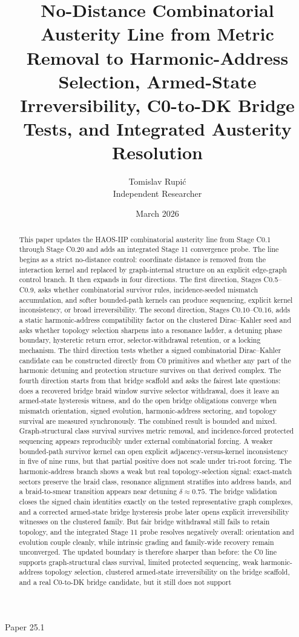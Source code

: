 \documentclass[11pt]{article}
\title{No-Distance Combinatorial Austerity Line from Metric Removal to Harmonic-Address Selection, Armed-State Irreversibility, C0-to-DK Bridge Tests, and Integrated Austerity Resolution}
\author{Tomislav Rupi\'c \\ Independent Researcher}
\date{March 2026}
\begin{document}
\maketitle
\begin{center}
\large Paper 25.1
\end{center}

\begin{abstract}
This paper updates the HAOS-IIP combinatorial austerity line from Stage C0.1 through Stage C0.20 and adds an integrated Stage 11 convergence probe. The line begins as a strict no-distance control: coordinate distance is removed from the interaction kernel and replaced by graph-internal structure on an explicit edge-graph control branch. It then expands in four directions. The first direction, Stages C0.5--C0.9, asks whether combinatorial survivor rules, incidence-seeded mismatch accumulation, and softer bounded-path kernels can produce sequencing, explicit kernel inconsistency, or broad irreversibility. The second direction, Stages C0.10--C0.16, adds a static harmonic-address compatibility factor on the clustered Dirac--Kahler seed and asks whether topology selection sharpens into a resonance ladder, a detuning phase boundary, hysteretic return error, selector-withdrawal retention, or a locking mechanism. The third direction tests whether a signed combinatorial Dirac--Kahler candidate can be constructed directly from C0 primitives and whether any part of the harmonic detuning and protection structure survives on that derived complex. The fourth direction starts from that bridge scaffold and asks the fairest late questions: does a recovered bridge braid window survive selector withdrawal, does it leave an armed-state hysteresis witness, and do the open bridge obligations converge when mismatch orientation, signed evolution, harmonic-address sectoring, and topology survival are measured synchronously. The combined result is bounded and mixed. Graph-structural class survival survives metric removal, and incidence-forced protected sequencing appears reproducibly under external combinatorial forcing. A weaker bounded-path survivor kernel can open explicit adjacency-versus-kernel inconsistency in five of nine runs, but that partial positive does not scale under tri-root forcing. The harmonic-address branch shows a weak but real topology-selection signal: exact-match sectors preserve the braid class, resonance alignment stratifies into address bands, and a braid-to-smear transition appears near detuning $\delta \approx 0.75$. The bridge validation closes the signed chain identities exactly on the tested representative graph complexes, and a corrected armed-state bridge hysteresis probe later opens explicit irreversibility witnesses on the clustered family. But fair bridge withdrawal still fails to retain topology, and the integrated Stage 11 probe resolves negatively overall: orientation and evolution couple cleanly, while intrinsic grading and family-wide recovery remain unconverged. The updated boundary is therefore sharper than before: the C0 line supports graph-structural class survival, limited protected sequencing, weak harmonic-address topology selection, clustered armed-state irreversibility on the bridge scaffold, and a real C0-to-DK bridge candidate, but it still does not support 
\end{abstract}
\end{document}
